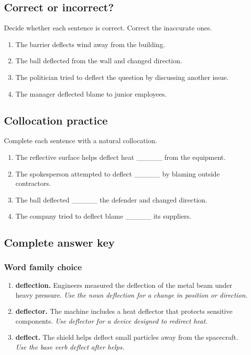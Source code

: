 \documentclass[11pt]{article}
\begin{document}
\subsection{Correct or incorrect?}
Decide whether each sentence is correct. Correct the inaccurate ones.

\begin{enumerate}
  \item The barrier deflects wind away from the building.
  \item The ball deflected from the wall and changed direction.
  \item The politician tried to deflect the question by discussing another issue.
  \item The manager deflected blame to junior employees.
\end{enumerate}

\subsection{Collocation practice}
Complete each sentence with a natural collocation.

\begin{enumerate}
  \item The reflective surface helps deflect heat \_\_\_\_\_ from the equipment.
  \item The spokesperson attempted to deflect \_\_\_\_\_ by blaming outside contractors.
  \item The ball deflected \_\_\_\_\_ the defender and changed direction.
  \item The company tried to deflect blame \_\_\_\_\_ its suppliers.
\end{enumerate}

\subsection{Complete answer key}
\subsubsection{Word family choice}
\begin{enumerate}
  \item \textbf{deflection.} Engineers measured the deflection of the metal beam under heavy pressure. \emph{Use the noun deflection for a change in position or direction.}
  \item \textbf{deflector.} The machine includes a heat deflector that protects sensitive components. \emph{Use deflector for a device designed to redirect heat.}
  \item \textbf{deflect.} The shield helps deflect small particles away from the spacecraft. \emph{Use the base verb deflect after helps.}
\end{enumerate}
\end{document}
